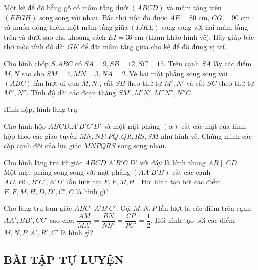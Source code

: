 \begin{vd}
	Một kệ để đồ bằng gỗ có mâm tầng dưới $(ABCD)$ và mâm tầng trên $(EFGH)$ song song với nhau. Bác thợ mộc đo được $AE=80$ cm, $CG=90$ cm và muốn đóng thêm một mâm tầng giữa $(IJKL)$ song song với hai mâm tầng trên và dưới sao cho khoảng cách $EI=36$ cm (tham khảo hình vẽ). Hãy giúp bác thợ mộc tính độ dài $GK$ để đặt mâm tầng giữa cho kệ để đồ đúng vị trí.
\end{vd}
\begin{vd}
	Cho hình chóp $S.ABC$ có $SA=9, SB=12, SC=15$. Trên cạnh $SA$ lấy các điểm $M, N$ sao cho $SM=4, MN=3, NA=2$. Vẽ hai mặt phẳng song song với $(ABC)$ lần lượt đi qua $M, N$ , cắt $SB$ theo thứ tự $M', N'$ và cắt $SC$ theo thứ tự $M'', N''$. Tính độ dài các đoạn thẳng $SM', M'N', M''N'', N''C$.
\end{vd}

\begin{dang}{Hình hộp, hình lăng trụ}
\end{dang}
\begin{vd}
Cho hình hộp $ABCD.A'B'C'D'$ và một mặt phẳng $(\alpha)$ cắt các mặt của hình hộp theo các giao tuyến $MN, NP, PQ, QR, RS, SM$ như hình vẽ. Chứng minh các cặp cạnh đối của lục giác $MNPQRS$ song song nhau.
\end{vd}
\begin{vd}
	Cho hình lăng trụ tứ giác $ABCD.A'B'C'D'$  với đáy là hình thang $AB\parallel CD$   . Một mặt phẳng song song với mặt phẳng $(AA'B'B)$   cắt các cạnh $AD, BC, B'C', A'D'$  lần lượt tại $E, F, M, H$ . Hỏi hình tạo bởi các điểm $E, F, M, H, D, D', C', C$  là hình gì?
	\loigiai{
}
\end{vd}
\begin{vd}
 Cho lăng trụ tam giác $A B C \cdot A' B' C'$. Gọi $M, N, P$ lần lượt là các điểm trên cạnh $A A', B B', C C'$ sao cho: $\dfrac{A M}{M A'}=\dfrac{B N}{N B'}=\dfrac{C P}{P C'}=\dfrac{1}{2}$. Hỏi hình tạo bởi các điểm $M, N, P, A', B', C'$ là hình gì?
 \loigiai{
}
\end{vd}


\subsection{BÀI TẬP TỰ LUYỆN}

